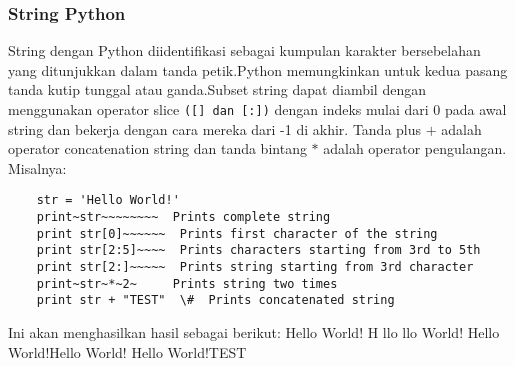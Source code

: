 \subsubsection{String Python}
String dengan Python diidentifikasi sebagai kumpulan karakter bersebelahan yang ditunjukkan dalam tanda petik.Python memungkinkan untuk kedua pasang tanda kutip tunggal atau ganda.Subset string dapat diambil dengan menggunakan operator slice \verb|([] dan [:])| dengan indeks mulai dari 0 pada awal string dan bekerja dengan cara mereka dari -1 di akhir. 
Tanda plus \(+\) adalah operator concatenation string dan tanda bintang \(*\) adalah operator pengulangan.
Misalnya:
\begin{verbatim}
	str = 'Hello World!' 
	print~str~~~~~~~~  Prints complete string 
	print str[0]~~~~~~  Prints first character of the string 
	print str[2:5]~~~~  Prints characters starting from 3rd to 5th
	print str[2:]~~~~~  Prints string starting from 3rd character 
	print~str~*~2~     Prints string two times 
	print str + "TEST"  \#  Prints concatenated string 
\end{verbatim}
Ini akan menghasilkan hasil sebagai berikut:
	Hello World! 
	H  
	llo 
	llo World!
	Hello World!Hello World! 
	Hello World!TEST

